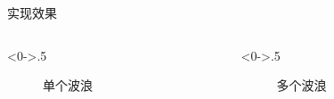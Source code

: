\documentclass[handout,t]{beamer}
\begin{document}
\begin{frame}{实现效果}

  \begin{columns} %
    \begin{column}<0->{.5\textwidth}
      \begin{figure}[thpb]
        \centering
        \caption{单个波浪}
        \label{fig:wyf-show-effect-left}
      \end{figure}
    \end{column}%
    \hfill%
    \begin{column}<0->{.5\textwidth}      
      \begin{figure}[thpb]
        \centering
          \label{fig:wyf-show-effect-right}
          \caption{多个波浪}
      \end{figure}
    \end{column}%
  \end{columns}

\end{frame}
\end{document}
